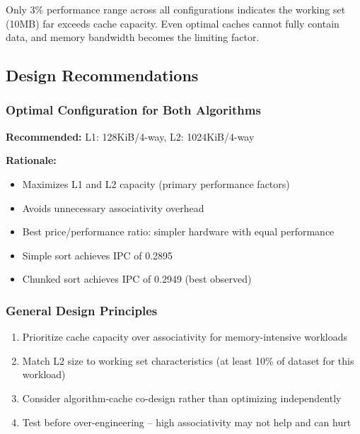 \documentclass[12pt,a4paper]{article}
\begin{document}
Only 3\% performance range across all configurations indicates the working set (10MB) far exceeds cache capacity. Even optimal caches cannot fully contain data, and memory bandwidth becomes the limiting factor.

\subsection{Design Recommendations}

\subsubsection{Optimal Configuration for Both Algorithms}

\textbf{Recommended:} L1: 128KiB/4-way, L2: 1024KiB/4-way

\textbf{Rationale:}
\begin{itemize}
    \item Maximizes L1 and L2 capacity (primary performance factors)
    \item Avoids unnecessary associativity overhead
    \item Best price/performance ratio: simpler hardware with equal performance
    \item Simple sort achieves IPC of 0.2895
    \item Chunked sort achieves IPC of 0.2949 (best observed)
\end{itemize}

\subsubsection{General Design Principles}

\begin{enumerate}
    \item Prioritize cache capacity over associativity for memory-intensive workloads
    \item Match L2 size to working set characteristics (at least 10\% of dataset for this workload)
    \item Consider algorithm-cache co-design rather than optimizing independently
    \item Test before over-engineering -- high associativity may not help and can hurt
\end{enumerate}

\newpage
\end{document}
